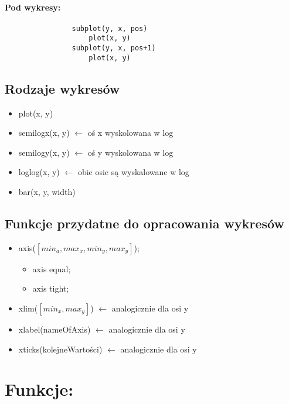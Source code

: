 \documentclass[16pt]{article}
\begin{document}
        \paragraph*{Pod wykresy:}
            \begin{lstlisting}
                subplot(y, x, pos)
                    plot(x, y)
                subplot(y, x, pos+1)
                    plot(x, y)
            \end{lstlisting}
        \subsection*{Rodzaje wykresów}
            \begin{itemize}
                \item plot(x, y)
                \item semilogx(x, y) $\leftarrow$ oś x wyskolowana w log
                \item semilogy(x, y) $\leftarrow$ oś y wyskolowana w log
                \item loglog(x, y) $\leftarrow$ obie osie są wyskalowane w log
                \item bar(x, y, width)   
            \end{itemize}

        \subsection*{Funkcje przydatne do opracowania wykresów}
            \begin{itemize}
                \item axis($[min_a, max_x, min_y, max_y]$);
                \begin{itemize}
                    \item axis equal;
                    \item axis tight;
                \end{itemize}
                \item xlim($[min_x, max_y]$) $\leftarrow$ analogicznie dla osi y
                \item xlabel(nameOfAxis) $\leftarrow$ analogicznie dla osi y
                \item xticks(kolejneWartości) $\leftarrow$ analogicznie dla osi y
            \end{itemize}
    
    
    
    \section{Funkcje:}
\end{document}
